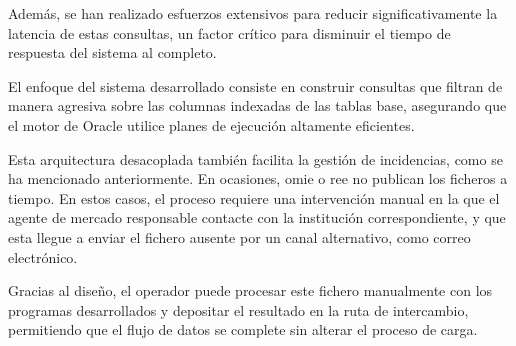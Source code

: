 Además, se han realizado esfuerzos extensivos para reducir significativamente la latencia de estas consultas, un factor crítico para disminuir el tiempo de respuesta del sistema al completo.

El enfoque del sistema desarrollado consiste en construir consultas que filtran de manera agresiva sobre las columnas indexadas de las tablas base, asegurando que el motor de Oracle utilice planes de ejecución altamente eficientes.

Esta arquitectura desacoplada también facilita la gestión de incidencias, como se ha mencionado anteriormente. En ocasiones, \gls{omie} o \gls{ree} no publican los ficheros a tiempo. En estos casos, el proceso requiere una intervención manual en la que el agente de mercado responsable contacte con la institución correspondiente, y que esta llegue a enviar el fichero ausente por un canal alternativo, como correo electrónico.

Gracias al diseño, el operador puede procesar este fichero manualmente con los programas desarrollados y depositar el resultado en la ruta de intercambio, permitiendo que el flujo de datos se complete sin alterar el proceso de carga.
